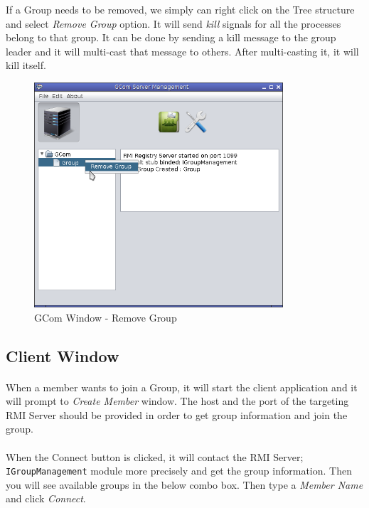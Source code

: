 \documentclass[a4paper,english,twoside]{article}
\begin{document}
If a Group needs to be removed, we simply can right click on the Tree structure and select \textit{Remove Group} option. It will send \textit{kill} signals for all the processes belong to that group. It can be done by sending a kill message to the group leader and it will multi-cast that message to others. After multi-casting it, it will kill itself.
\begin{figure}[h]
\begin{center}
\includegraphics[width=350px]{GCom-RemoveGroup.png}
\caption{GCom Window - Remove Group}
\end{center}
\end{figure}

\subsection{Client Window}
\paragraph{}
When a member wants to join a Group, it will start the client application and it will prompt to \textit{Create Member} window. The host and the port of the targeting RMI Server should be provided in order to get group information and join the group.

\paragraph{}
When the Connect button is clicked, it will contact the RMI Server; \texttt{IGroupManagement} module more precisely and get the group information. Then you will see available groups in the below combo box. Then type a \textit{Member Name} and click \textit{Connect}.
\end{document}

